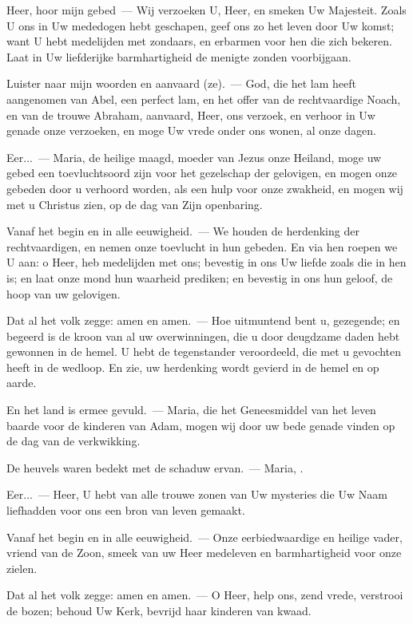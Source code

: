 \documentclass[12pt,twoside,a5paper]{article}
\begin{document}
\begin{halfparskip}
  Heer, hoor mijn gebed~--- Wij verzoeken U, Heer, en smeken Uw Majesteit. Zoals U ons in Uw mededogen hebt geschapen, geef ons zo het leven door Uw komst; want U hebt medelijden met zondaars, en erbarmen voor hen die zich bekeren. Laat in Uw liefderijke barmhartigheid de menigte zonden voorbijgaan.

  Luister naar mijn woorden en aanvaard (ze).~--- God, die het lam heeft aangenomen van Abel, een perfect lam, en het offer van de rechtvaardige Noach, en van de trouwe Abraham, aanvaard, Heer, ons verzoek, en verhoor in Uw genade onze verzoeken, en moge Uw vrede onder ons wonen, al onze dagen.

  Eer...~--- Maria, de heilige maagd, moeder van Jezus onze Heiland, moge uw gebed een toevluchtsoord zijn voor het gezelschap der gelovigen, en mogen onze gebeden door u verhoord worden, als een hulp voor onze zwakheid, en mogen wij met u Christus zien, op de dag van Zijn openbaring.

  Vanaf het begin en in alle eeuwigheid.~--- We houden de herdenking der rechtvaardigen, en nemen onze toevlucht in hun gebeden. En via hen roepen we U aan: o Heer, heb medelijden met ons; bevestig in ons Uw liefde zoals die in hen is; en laat onze mond hun waarheid prediken; en bevestig in ons hun geloof, de hoop van uw gelovigen.

  Dat al het volk zegge: amen en amen.~--- Hoe uitmuntend bent u, gezegende; en begeerd is de kroon van al uw overwinningen, die u door deugdzame daden hebt gewonnen in de hemel. U hebt de tegenstander veroordeeld, die met u gevochten heeft in de wedloop. En zie, uw herdenking wordt gevierd in de hemel en op aarde.
\end{halfparskip}


\begin{halfparskip}
  En het land is ermee gevuld.~--- Maria, die het Geneesmiddel van het leven baarde voor de kinderen van Adam, mogen wij door uw bede genade vinden op de dag van de verkwikking.

  De heuvels waren bedekt met de schaduw ervan.~--- Maria, .

  Eer...~--- Heer, U hebt van alle trouwe zonen van Uw mysteries die Uw Naam liefhadden voor ons een bron van leven gemaakt.

  Vanaf het begin en in alle eeuwigheid.~--- Onze eerbiedwaardige en heilige vader, vriend van de Zoon, smeek van uw Heer medeleven en barmhartigheid voor onze zielen.

  Dat al het volk zegge: amen en amen.~--- O Heer, help ons, zend vrede, verstrooi de bozen; behoud Uw Kerk, bevrijd haar kinderen van kwaad.
\end{halfparskip}
\end{document}
